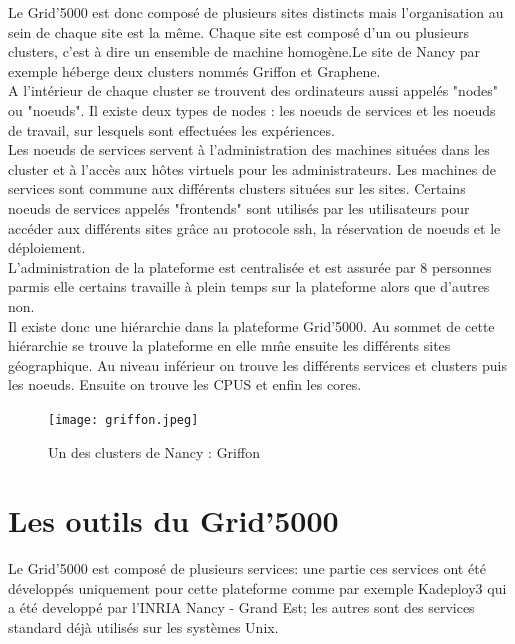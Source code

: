 \documentclass[a4paper, 10pt, onecolumn]{report}
\begin{document}
Le Grid'5000 est donc composé de plusieurs sites distincts mais l'organisation au sein de chaque site est la même. Chaque site est composé d'un ou plusieurs clusters, c'est à dire un ensemble de machine homogène.Le site de Nancy par exemple héberge deux clusters nommés Griffon et Graphene. \\
A l'intérieur de chaque cluster se trouvent des ordinateurs aussi appelés "nodes" ou "noeuds". Il existe deux types de nodes : les noeuds de services et les noeuds de travail, sur lesquels sont effectuées les expériences.\\
 Les noeuds de services servent à l'administration des machines situées dans les cluster et à l'accès aux hôtes virtuels pour les administrateurs. Les machines de services sont commune aux différents clusters situées sur les sites. Certains noeuds de services appelés "frontends" sont utilisés par les utilisateurs pour accéder aux différents sites grâce au protocole ssh, la réservation de noeuds et le déploiement. \\
L'administration de la plateforme est centralisée et est assurée par 8 personnes parmis elle certains travaille à plein temps sur la plateforme alors que d'autres non.\\
Il existe donc une hiérarchie dans la plateforme Grid'5000. Au sommet de cette hiérarchie se trouve la plateforme en elle m\^me ensuite les différents sites géographique. Au niveau inférieur on trouve les différents services et clusters puis les noeuds.  Ensuite on trouve les CPUS et enfin les cores.
	\begin{figure}[!h]
		\centering
   		\texttt{[image: griffon.jpeg]}
   		\caption{Un des clusters de Nancy : Griffon}
    	\label{fig:griffon}
	\end{figure}
	
	\section{Les outils du Grid'5000}
		Le Grid'5000 est composé de plusieurs services: une partie ces services ont été développés uniquement pour cette plateforme comme par exemple Kadeploy3 qui a été developpé par l'INRIA Nancy - Grand Est; les autres sont des services standard déjà utilisés sur les systèmes Unix.  
\end{document}

